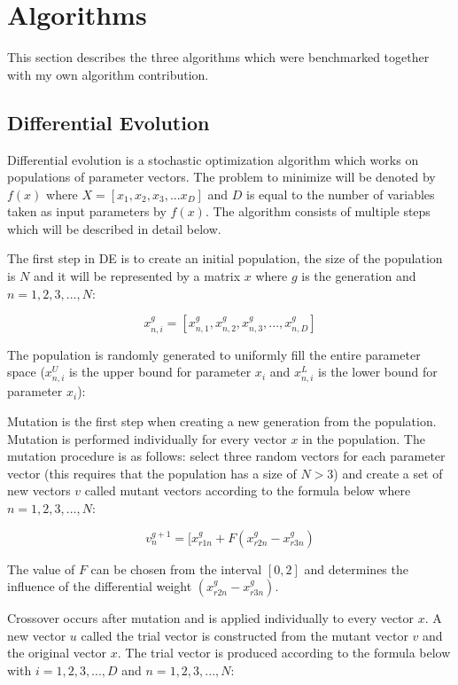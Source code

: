 \section{Algorithms}

This section describes the three algorithms which were benchmarked together with my own algorithm contribution.

\subsection{Differential Evolution}

Differential evolution \cite{Storn1997} is a stochastic optimization algorithm which works on populations of parameter vectors. The problem to minimize will be denoted by $f(x)$ where $X=[x_1,x_2,x_3,...x_D]$ and $D$ is equal to the number of variables taken as input parameters by $f(x)$. The algorithm consists of multiple steps which will be described in detail below.

The first step in DE is to create an initial population, the size of the population is $N$ and it will be represented by a matrix $x$ where $g$ is the generation and $n=1,2,3,...,N$:

\begin{equation}
x_{n,i}^{g} = [ x_{n,1}^{g}, x_{n,2}^{g}, x_{n,3}^{g}, ..., x_{n,D}^{g} ]
\end{equation}

The population is randomly generated to uniformly fill the entire parameter space ($x_{n,i}^U$ is the upper bound for parameter $x_i$ and $x_{n,i}^L$ is the lower bound for parameter $x_i$):

Mutation is the first step when creating a new generation from the population. Mutation is performed individually for every vector $x$ in the population. The mutation procedure is as follows: select three random vectors for each parameter vector (this requires that the population has a size of $N > 3$) and create a set of new vectors $v$ called mutant vectors according to the formula below where $n=1,2,3,...,N$:

\begin{equation}
v_{n}^{g+1} = [ x_{r1n}^{g} + F(x_{r2n}^{g} - x_{r3n}^{g})
\end{equation}

The value of $F$ can be chosen from the interval $[0,2]$ and determines the influence of the differential weight $(x_{r2n}^{g} - x_{r3n}^{g})$.

Crossover occurs after mutation and is applied individually to every vector $x$. A new vector $u$ called the trial vector is constructed from the mutant vector $v$ and the original vector $x$. The trial vector is produced according to the formula below with $i=1,2,3,...,D$ and $n=1,2,3,...,N$:

